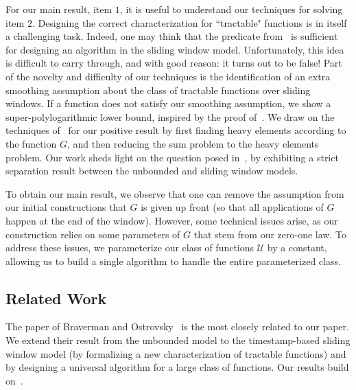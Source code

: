 \documentclass[11pt]{article}
\begin{document}
For our main result, item $1$, it is useful to understand our techniques for solving
item $2$.  Designing the correct characterization for ``tractable" functions is in itself a challenging task.
Indeed, one may think that the predicate from~\cite{BO10} is sufficient for designing an algorithm
in the sliding window model.  Unfortunately, this idea is difficult to carry through, and with good reason:
it turns out to be false!  Part of the novelty and difficulty of our techniques is the identification of an extra smoothing
assumption about the class of tractable functions over sliding windows.  If a function
does not satisfy our smoothing assumption, we show a super-polylogarithmic lower bound,
inspired by the proof of~\cite{DGIM02}.
We draw on the techniques of~\cite{BO10,BO13,IW05} for our positive result by first finding
heavy elements according to the function $G$, and then reducing the sum problem to the heavy elements
problem.  Our work sheds light on the question posed in~\cite{sub20},
by exhibiting a strict separation result between the unbounded and sliding window models.

To obtain our main result, we observe that one can remove the assumption from our initial constructions
that $G$ is given up front (so that all applications of $G$ happen at the end of the window).  However,
some technical issues arise, as our construction relies on some parameters of $G$ that stem from our
zero-one law.  To address these issues, we parameterize our class of functions $\mathcal{U}$ by a constant,
allowing us to build a single algorithm to handle the entire parameterized class.

\subsection{Related Work}
The paper of Braverman and Ostrovsky~\cite{BO10} is the most closely related to our paper.
We extend their result from the unbounded model to the timestamp-based sliding window model
(by formalizing a new characterization of tractable functions) and by designing a universal
algorithm for a large class of functions.  Our results build on~\cite{BO10,BO13,IW05}.
\end{document}

